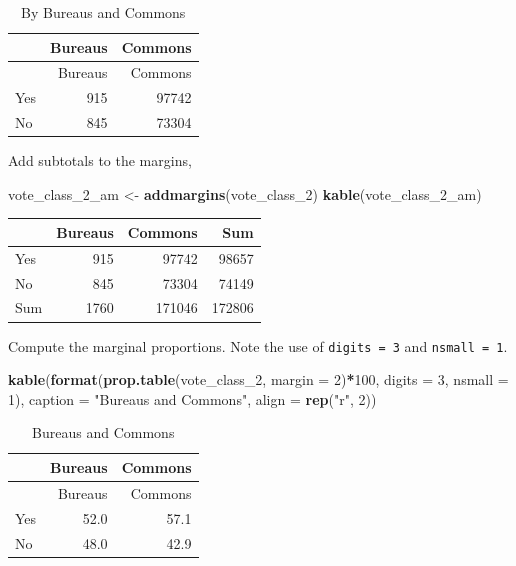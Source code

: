 \documentclass[
]{article}
\newenvironment{Shaded}{\begin{snugshade}}{\end{snugshade}}
\newcommand{\DataTypeTok}[1]{\textcolor[rgb]{0.13,0.29,0.53}{#1}}
\newcommand{\DecValTok}[1]{\textcolor[rgb]{0.00,0.00,0.81}{#1}}
\newcommand{\KeywordTok}[1]{\textcolor[rgb]{0.13,0.29,0.53}{\textbf{#1}}}
\newcommand{\NormalTok}[1]{#1}
\newcommand{\OperatorTok}[1]{\textcolor[rgb]{0.81,0.36,0.00}{\textbf{#1}}}
\newcommand{\StringTok}[1]{\textcolor[rgb]{0.31,0.60,0.02}{#1}}
\begin{document}
\begin{longtable}[]{@{}lrr@{}}
\caption{By Bureaus and Commons}\tabularnewline
\toprule
& Bureaus & Commons\tabularnewline
\midrule
\endfirsthead
\toprule
& Bureaus & Commons\tabularnewline
\midrule
\endhead
Yes & 915 & 97742\tabularnewline
No & 845 & 73304\tabularnewline
\bottomrule
\end{longtable}

Add subtotals to the margins,

\begin{Shaded}
\begin{Highlighting}[]
\NormalTok{vote\_class\_}\DecValTok{2}\NormalTok{\_am \textless{}{-}}\StringTok{ }\KeywordTok{addmargins}\NormalTok{(vote\_class\_}\DecValTok{2}\NormalTok{)}
\KeywordTok{kable}\NormalTok{(vote\_class\_}\DecValTok{2}\NormalTok{\_am)}
\end{Highlighting}
\end{Shaded}

\begin{longtable}[]{@{}lrrr@{}}
\toprule
& Bureaus & Commons & Sum\tabularnewline
\midrule
\endhead
Yes & 915 & 97742 & 98657\tabularnewline
No & 845 & 73304 & 74149\tabularnewline
Sum & 1760 & 171046 & 172806\tabularnewline
\bottomrule
\end{longtable}

Compute the marginal proportions. Note the use of \texttt{digits\ =\ 3}
and \texttt{nsmall\ =\ 1}.

\begin{Shaded}
\begin{Highlighting}[]
\KeywordTok{kable}\NormalTok{(}\KeywordTok{format}\NormalTok{(}\KeywordTok{prop.table}\NormalTok{(vote\_class\_}\DecValTok{2}\NormalTok{, }\DataTypeTok{margin =} \DecValTok{2}\NormalTok{)}\OperatorTok{*}\DecValTok{100}\NormalTok{, }\DataTypeTok{digits =} \DecValTok{3}\NormalTok{, }\DataTypeTok{nsmall =} \DecValTok{1}\NormalTok{), }\DataTypeTok{caption =} \StringTok{"Bureaus and Commons"}\NormalTok{, }\DataTypeTok{align =} \KeywordTok{rep}\NormalTok{(}\StringTok{"r"}\NormalTok{, }\DecValTok{2}\NormalTok{))}
\end{Highlighting}
\end{Shaded}

\begin{longtable}[]{@{}lrr@{}}
\caption{Bureaus and Commons}\tabularnewline
\toprule
& Bureaus & Commons\tabularnewline
\midrule
\endfirsthead
\toprule
& Bureaus & Commons\tabularnewline
\midrule
\endhead
Yes & 52.0 & 57.1\tabularnewline
No & 48.0 & 42.9\tabularnewline
\bottomrule
\end{longtable}
\end{document}
